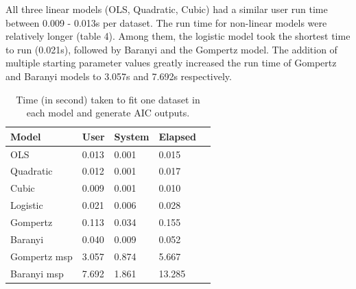 \documentclass[11pt]{article}
\begin{document}
\vspace{\baselineskip}

All three linear models (OLS, Quadratic, Cubic) had a similar user run time between 0.009 - 0.013s per dataset. The run time for non-linear models were relatively longer (table 4). Among them, the logistic model took the shortest time to run (0.021s), followed by Baranyi and the Gompertz model. The addition of multiple starting parameter values greatly increased the run time of Gompertz and Baranyi models to 3.057s and 7.692s respectively. 

\vspace{\baselineskip}

\begin{table}[H]
\caption{Time (in second) taken to fit one dataset in each model and generate AIC outputs.}
\begin{tabular}{@{}lllll@{}}
\toprule
Model        & User  & System & Elapsed &  \\ \midrule
OLS          & 0.013 & 0.001  & 0.015   &  \\
Quadratic    & 0.012 & 0.001  & 0.017   &  \\
Cubic        & 0.009 & 0.001  & 0.010   &  \\
Logistic     & 0.021 & 0.006  & 0.028   &  \\
Gompertz     & 0.113 & 0.034  & 0.155   &  \\
Baranyi      & 0.040 & 0.009  & 0.052   &  \\
Gompertz msp & 3.057 & 0.874  & 5.667   &  \\
Baranyi msp  & 7.692 & 1.861  & 13.285  & 
\end{tabular}
\end{table}
\end{document}
